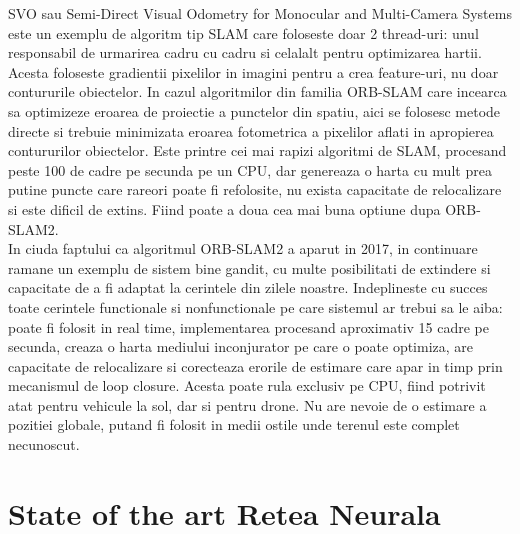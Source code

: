 \documentclass[12pt,a4paper]{report}
\begin{document}
SVO sau Semi-Direct Visual Odometry for Monocular and Multi-Camera Systems este un exemplu 
de algoritm tip SLAM care foloseste doar 2 thread-uri: unul responsabil de 
urmarirea cadru cu cadru si celalalt pentru optimizarea hartii. Acesta foloseste gradientii
pixelilor in imagini pentru a crea feature-uri, nu doar contururile obiectelor. In cazul
algoritmilor din familia ORB-SLAM care incearca sa optimizeze eroarea de proiectie a punctelor
din spatiu, aici se folosesc metode directe si trebuie minimizata eroarea fotometrica a 
pixelilor aflati in apropierea contururilor obiectelor. Este printre cei mai rapizi algoritmi
de SLAM, procesand peste 100 de cadre pe secunda pe un CPU, dar genereaza o harta cu mult 
prea putine puncte care rareori poate fi refolosite, nu exista capacitate de relocalizare si 
este dificil de extins. Fiind poate a doua cea mai buna optiune dupa ORB-SLAM2.\\

In ciuda faptului ca algoritmul ORB-SLAM2 a aparut in 2017, in continuare ramane
un exemplu de sistem bine gandit, cu multe posibilitati de extindere si capacitate de a fi 
adaptat la cerintele din zilele noastre. Indeplineste cu succes toate cerintele functionale 
si nonfunctionale pe care sistemul ar trebui sa le aiba: poate fi folosit in real time,
implementarea procesand aproximativ 15 cadre pe secunda, creaza o harta mediului inconjurator
pe care o poate optimiza, are capacitate de relocalizare si corecteaza erorile de estimare
care apar in timp prin mecanismul de loop closure. Acesta poate rula exclusiv pe CPU, fiind
potrivit atat pentru vehicule la sol, dar si pentru drone. Nu are nevoie de o estimare a pozitiei
globale, putand fi folosit in medii ostile unde terenul este complet necunoscut.  

\section{State of the art Retea Neurala}
\end{document}
